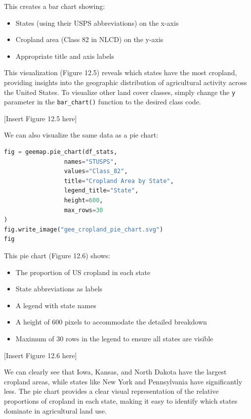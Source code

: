 This creates a bar chart showing:

\begin{itemize}
\item States (using their USPS abbreviations) on the x-axis
\item Cropland area (Class 82 in NLCD) on the y-axis
\item Appropriate title and axis labels
\end{itemize}

This visualization (Figure 12.5) reveals which states have the most cropland, providing insights into the geographic distribution of agricultural activity across the United States. To visualize other land cover classes, simply change the \texttt{y} parameter in the \texttt{bar\_chart()} function to the desired class code.

[Insert Figure 12.5 here]

We can also visualize the same data as a pie chart:

\begin{lstlisting}[language=Python]
fig = geemap.pie_chart(df_stats,
                 names="STUSPS",
                 values="Class_82",
                 title="Cropland Area by State",
                 legend_title="State",
                 height=600,
                 max_rows=30
)
fig.write_image("gee_cropland_pie_chart.svg")
fig
\end{lstlisting}

This pie chart (Figure 12.6) shows:

\begin{itemize}
\item The proportion of US cropland in each state
\item State abbreviations as labels
\item A legend with state names
\item A height of 600 pixels to accommodate the detailed breakdown
\item Maximum of 30 rows in the legend to ensure all states are visible
\end{itemize}

[Insert Figure 12.6 here]

We can clearly see that Iowa, Kansas, and North Dakota have the largest cropland areas, while states like New York and Pennsylvania have significantly less. The pie chart provides a clear visual representation of the relative proportions of cropland in each state, making it easy to identify which states dominate in agricultural land use.

